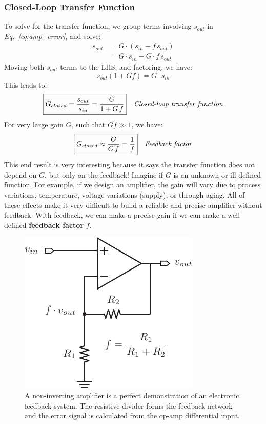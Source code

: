 \subsubsection{Closed-Loop Transfer Function}
To solve for the transfer function, we group terms involving $s_{out}$ in \emph{Eq.~\ref{eq:amp_error}}, and solve:
    \begin{align}
        s_{out} &= G \cdot (s_{in} - f\,s_{out})\\
        &= G \cdot s_{in} - G \cdot f\,s_{out}
    \end{align}
Moving both $s_{out}$ terms to the LHS, and factoring, we have:
    \begin{equation}
        s_{out}(1 + Gf) = G \cdot s_{in}
    \end{equation}
This leads to:
    \begin{align}
        \Aboxed{G_{closed} &= \frac{s_{out}}{s_{in}} = \frac{G}{1 + G\,f}}
        &\textit{Closed-loop transfer function}
        \label{eq:cl_trans_func}
    \end{align}
For very large gain $G$, such that $Gf \gg 1$, we have:
    \begin{align}
        \Aboxed{G_{closed} &\approx \frac{G}{G\,f} = \frac{1}{f}}
        &\textit{Feedback factor}
        \label{eq:feedback_factor}
    \end{align}
This end result is very interesting because it says the transfer function does not depend on $G$, but only on the feedback!  Imagine if $G$ is an unknown or ill-defined function.  For example, if we design an amplifier, the gain will vary due to process variations, temperature, voltage variations (supply), or through aging.  All of these effects make it very difficult to build a reliable and precise amplifier without feedback.  With feedback, we can make a precise gain if we can make a well defined \textbf{feedback factor} $f$.
\newpage
\begin{figure}[t]
\centering
\includegraphics[scale=1.25]{opamp_fb}
\caption{A non-inverting amplifier is a perfect demonstration of an electronic feedback system.  The resistive divider forms the feedback network and the error signal is calculated from the op-amp differential input.}
\label{fig:opamp_fb}
\end{figure}
